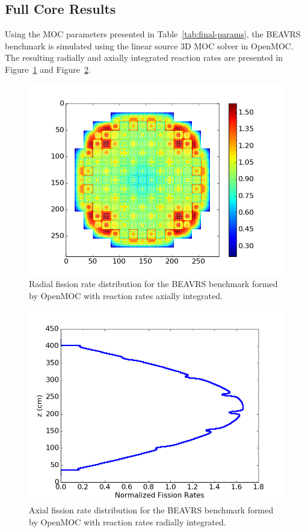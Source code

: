 \documentclass[12pt,twoside]{mitthesis-exec}
\begin{document}
\subsection*{Full Core Results}


Using the MOC parameters presented in Table~\ref{tab:final-params}, the BEAVRS benchmark is simulated using the linear source 3D MOC solver in OpenMOC. The resulting radially and axially integrated reaction rates are presented in Figure~\ref{fig:full-core-radial} and Figure~\ref{fig:full-core-axial}.

\begin{figure}[ht!]
	\centering
	\includegraphics[width=0.65\linewidth]{figures/results/rr-plots/beavrs-3d-radial.png}
	\caption{Radial fission rate distribution for the BEAVRS benchmark formed by OpenMOC with reaction rates axially integrated.}
	\label{fig:full-core-radial}
\end{figure}

\begin{figure}[ht!]
	\centering
	\includegraphics[width=0.65\linewidth]{figures/results/rr-plots/beavrs-3d-axial.png}
	\caption{Axial fission rate distribution for the BEAVRS benchmark formed by OpenMOC with reaction rates radially integrated.}
	\label{fig:full-core-axial}
\end{figure}
\end{document}
